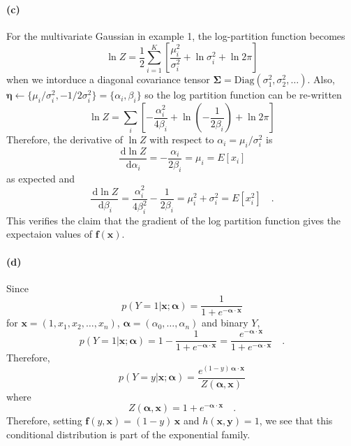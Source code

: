 \documentclass[11pt]{article}
\newcommand{\pr}[1]{\ensuremath{p(#1)}}
\newcommand{\bvec}[1]{\ensuremath{\boldsymbol{#1}}}
\renewcommand{\vector}[1]{\bvec{#1}}
\newcommand{\dd}{\ensuremath{\, \mathrm{d}}}
\begin{document}
\paragraph{(c)} For the multivariate Gaussian in example 1, the log-partition
function becomes
\begin{equation}
    \ln Z = \frac{1}{2} \sum_{i=1}^{K} \left [ \frac{\mu_i^2}{\sigma_i^2}
    + \ln \sigma_i^2 + \ln 2\pi \right ]
\end{equation}
when we intorduce a diagonal covariance tensor
$\vector{\Sigma} = \mathrm{Diag}(\sigma_1^2, \sigma_2^2,\ldots)$. Also,
$\vector{\eta} \gets \{ \mu_i/\sigma_i^2, -1/2\sigma_i^2 \}
= \{\alpha_i, \beta_i\}$ so the log partition function can be re-written
\begin{equation}
    \ln Z = \sum_i \left [ -\frac{\alpha_i^2}{4 \beta_i} +
    \ln \left ( -\frac{1}{2 \beta_i} \right ) + \ln 2\pi\right ]
\end{equation}
Therefore, the derivative of $\ln Z$ with respect to
$\alpha_i = \mu_i/\sigma_i^2$ is
\begin{equation}
    \frac{\dd \ln Z}{\dd \alpha_i} = -\frac{\alpha_i}{2\beta_i} = \mu_i = E[x_i]
\end{equation}
as expected and
\begin{equation}
    \frac{\dd \ln Z}{\dd \beta_i} = \frac{\alpha_i^2}{4 \beta_i^2}
        -\frac{1}{2\beta_i} = \mu_i^2 + \sigma_i^2 = E[x_i^2] \quad .
\end{equation}
This verifies the claim that the gradient of the log partition function
gives the expectaion values of $\vector{f} (\vector{x})$.

\paragraph{(d)}

Since
\begin{equation}
    \pr{Y=1|\vector{x}; \vector{\alpha}} =
    \frac{1}{1+e^{-\vector{\alpha}\cdot\vector{x}}}
\end{equation}
for $\vector{x} = (1, x_1, x_2, \ldots, x_n)$, $\vector{\alpha} =
(\alpha_0, \ldots, \alpha_n)$ and binary $Y$,
\begin{equation}
    \pr{Y=1|\vector{x}; \vector{\alpha}} = 1-
    \frac{1}{1+e^{-\vector{\alpha}\cdot\vector{x}}}
    = \frac{e^{-\vector{\alpha}\cdot\vector{x}}}%
        {1+e^{-\vector{\alpha}\cdot\vector{x}}} \quad .
\end{equation}
Therefore,
\begin{equation}
    \pr{Y=y | \vector{x}; \vector{\alpha}} =
    \frac{e^{(1-y) \, \vector{\alpha}\cdot\vector{x}}}{Z(\vector{\alpha},\vector{x})}
\end{equation}
where
\begin{equation}
    Z(\vector{\alpha},\vector{x}) = 1+e^{-\vector{\alpha}\cdot\vector{x}} \quad .
\end{equation}
Therefore, setting $\vector{f}(y, \vector{x}) = (1-y) \, \vector{x}$ and
$h(\vector{x}, \vector{y}) = 1$, we see
that this conditional distribution is part of the exponential family.
\end{document}
